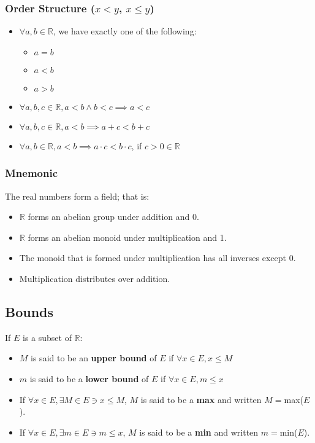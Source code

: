\documentclass{article}
\theoremstyle{break}
\begin{document}
\subsubsection{Order Structure ($x < y$, $x \le y$)}
\begin{itemize}
\item $\forall a, b \in \mathbb{R}$, we have exactly one of the following:
  \begin{itemize}
  \item $a = b$
  \item $a < b$
  \item $a > b$
  \end{itemize}
\item $\forall a, b, c \in \mathbb{R}, a < b \land b < c \implies a < c$
\item $\forall a, b, c \in \mathbb{R}, a < b \implies a + c < b + c$
\item $\forall a, b \in \mathbb{R}, a < b \implies a \cdot c < b \cdot c$, if $c
  > 0 \in \mathbb{R}$
\end{itemize}

\subsubsection{Mnemonic}
The real numbers form a field; that is:

\begin{itemize}
\item $\mathbb{R}$ forms an abelian group under addition and 0.
\item $\mathbb{R}$ forms an abelian monoid under multiplication and 1.
\item The monoid that is formed under multiplication has all inverses except 0.
\item Multiplication distributes over addition.
\end{itemize}

\subsection{Bounds}
If $E$ is a subset of $\mathbb{R}$:

\begin{itemize}
\item $M$ is said to be an \textbf{upper bound} of $E$ if $\forall x \in E, x
  \le M$
\item $m$ is said to be a \textbf{lower bound} of $E$ if $\forall x \in E, m \le
  x$
\item If $\forall x \in E, \exists M \in E \ni x \le M$, $M$ is said to be a
  \textbf{max} and written $M = $max($E$).
\item If $\forall x \in E, \exists m \in E \ni m \le x$, $M$ is said to be a
  \textbf{min} and written $m = $min($E$).
\end{itemize}
\end{document}

